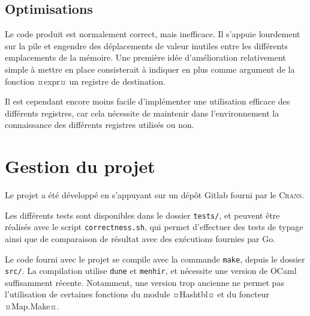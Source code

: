 \documentclass{rapport}
\begin{document}
\subsection{Optimisations}
Le code produit est normalement correct, mais inefficace. Il s'appuie lourdement sur la pile et engendre des déplacements de valeur inutiles entre les différents emplacements de la mémoire. Une première idée d'amélioration relativement simple à mettre en place consisterait à indiquer en plus comme argument de la fonction ¤expr¤ un registre de destination.

Il est cependant encore moins facile d'implémenter une utilisation efficace des différents registres, car cela nécessite de maintenir dans l'environnement la connaissance des différents registres utilisés ou non.


\section{Gestion du projet}
Le projet a été développé en s'appuyant sur un dépôt Gitlab fourni par le \textsc{Crans}.

Les différents tests sont disponibles dans le dossier \texttt{tests/}, et peuvent être réalisés avec le script \texttt{correctness.sh}, qui permet d'effectuer des tests de typage ainsi que de comparaison de résultat avec des exécutions fournies par \textsf{Go}.

Le code fourni avec le projet se compile avec la commande \texttt{make}, depuis le dossier \texttt{src/}. La compilation utilise \texttt{dune} et \texttt{menhir}, et nécessite une version de \textsf{OCaml} suffisamment récente. Notamment, une version trop ancienne ne permet pas l'utilisation de certaines fonctions du module ¤Hashtbl¤ et du foncteur ¤Map.Make¤.
\end{document}
